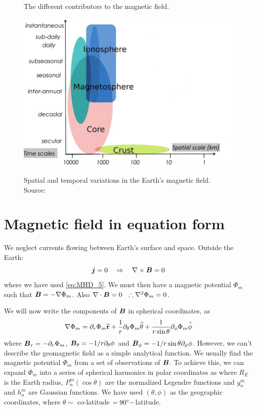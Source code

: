 \begin{figure}[ht]
	\caption{The different contributors to the magnetic field.}\label{fig:L3_earth_magnetic_four_contributors}
\end{figure}
\begin{figure}[ht]
    \centering
    \includegraphics[width=.6\linewidth]{bilder/L3_earth_magnetic_contributors.jpg}\label{fig:L3_earth_magnetic_contributors}
    \caption{Spatial and temporal variations in the Earth's magnetic field. Source: }
\end{figure}

\section{Magnetic field in equation form}
We neglect currents flowing between Earth's surface and space. Outside the Earth:
\begin{equation*}
    \boldsymbol{j}=0\quad\Rightarrow\quad\nabla\times\boldsymbol{B}=0
\end{equation*}
where we have used \cref{eq:MHD_5}. We must then have a magnetic potential \(\Phi_m\) such that \(\boldsymbol{B}=-\nabla\Phi_m\). Also \(\nabla\cdot\boldsymbol{B}=0~~\therefore \nabla^2\Phi_m=0\).

We will now write the components of \(\boldsymbol{B}\) in spherical coordinates, as
\begin{equation}
    \nabla\Phi_m=\partial_{r}\Phi_m\widehat{\mathbf{r}}+\frac{1}{r}\partial_{\theta}\Phi_m\widehat{\mathbf{\theta}}+\frac{1}{r\sin\theta}\partial_{\phi}\Phi_m\widehat{\mathbf{\phi}}
\end{equation}
where \(\boldsymbol{B}_r=-\partial_{r}\Phi_m\), \(\boldsymbol{B}_\theta=-1/r\partial_{\theta}\phi\) and \(\boldsymbol{B}_\phi=-1/r\sin\theta\partial_{\phi}\phi\). However, we can't describe the geomagnetic field as a simple analytical function. We usually find the magnetic potential \(\Phi_m\) from a set of observations of \(\boldsymbol{B}\). To achieve this, we can expand \(\Phi_m\) into a series of spherical harmonics in polar coordinates as
where \(R_E\) is the Earth radius, \(P_n^m(\cos\theta)\) are the normalized Legendre functions and \(g_n^m\) and \(h_n^m\) are Gaussian functions. We have used \((\theta,\phi)\) as the geographic coordinates, where \(\theta\sim \) co-latitude \(=90^\circ-\)latitude.

